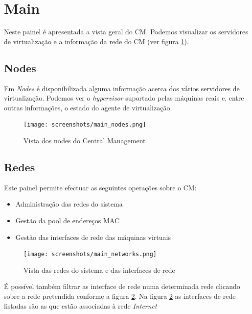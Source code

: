 \section{Main}

Neste painel é apresentada a vista geral do CM.
Podemos visualizar os servidores de virtualização e a informação da rede do CM (ver figura \ref{fig:main_nodes}).

\subsection{Nodes}
\label{sub:nodes}

Em \emph{Nodes} é disponibilizada alguma informação acerca dos vários servidores de virtualização. Podemos ver o \emph{hypervisor} suportado pelas máquinas reais e, entre outras informações, o estado do agente de virtualização.
\begin{figure}[H]
	\begin{center}
	\texttt{[image: screenshots/main\_nodes.png]}
	\caption{Vista dos nodes do Central Management}
	\label{fig:main_nodes}
	\end{center}
\end{figure}

\subsection{Redes}
\label{sub:redes}

Este painel permite efectuar as seguintes operações sobre o CM:

\begin{itemize}
	\item Administração das redes do sistema
	\item Gestão da pool de endereços MAC
	\item Gestão das interfaces de rede das máquinas virtuais 
\end{itemize}

\begin{figure}[H]
	\begin{center}
	\texttt{[image: screenshots/main\_networks.png]}
	\caption{Vista das redes do sistema  e das interfaces de rede}
	\label{fig:main_networks}
	\end{center}
\end{figure}

É possível também filtrar as interface de rede numa determinada rede clicando sobre a rede pretendida conforme a figura \ref{fig:main_networks}.
Na figura \ref{fig:main_networks} as interfaces de rede listadas são as que estão associadas à rede \emph{Internet}

